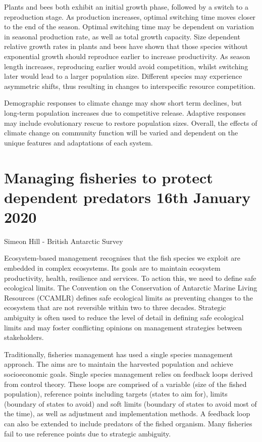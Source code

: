\documentclass{article}
\begin{document}
\noindent Plants and bees both exhibit an initial growth phase, followed by a switch to a reproduction stage. As production increases, optimal switching time moves closer to the end of the season. Optimal switching time may be dependent on variation in seasonal production rate, as well as total growth capacity. Size dependent relative growth rates in plants and bees have shown that those species without exponential growth should reproduce earlier to increase productivity. As season length increases, reproducing earlier would avoid competition, whilst switching later would lead to a larger population size. Different species may experience asymmetric shifts, thus resulting in changes to interspecific resource competition. \bigskip

\noindent Demographic responses to climate change may show short term declines, but long-term population increases due to competitive release. Adaptive responses may include evolutionary rescue to restore population sizes. Overall, the effects of climate change on community function will be varied and dependent on the unique features and adaptations of each system.   

\section{Managing fisheries to protect dependent predators 16th January 2020}

Simeon Hill - British Antarctic Survey \bigskip

\noindent Ecosystem-based management recognises that the fish species we exploit are embedded in complex ecosystems. Its goals are to maintain ecosystem productivity, health, resilience and services. To action this, we need to define safe ecological limits. The Convention on the Conservation of Antarctic Marine Living Resources (CCAMLR) defines safe ecological limits as preventing changes to the ecosystem that are not reversible within two to three decades. Strategic ambiguity is often used to reduce the level of detail in defining safe ecological limits and may foster conflicting opinions on management strategies between stakeholders.  \bigskip

\noindent Traditionally, fisheries management has used a single species management approach. The aims are to maintain the harvested population and achieve socioeconomic goals. Single species management relies on feedback loops derived from control theory. These loops are comprised of a variable (size of the fished population), reference points including targets (states to aim for), limits (boundary of states to avoid) and soft limits (boundary of states to avoid most of the time), as well as adjustment and implementation methods. A feedback loop can also be extended to include predators of the fished organism. Many fisheries fail to use reference points due to strategic ambiguity. \bigskip
\end{document}
